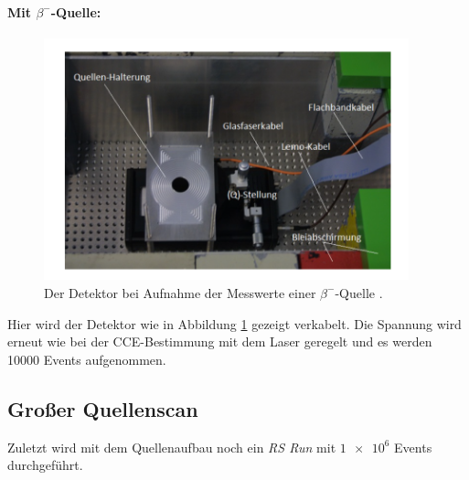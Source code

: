 \paragraph{Mit $\beta^-$-Quelle:}
\begin{figure}
  \centering
  \includegraphics[height=7cm]{TimosAufrisse/quellenmessung.png}
  \caption{Der Detektor bei Aufnahme der Messwerte einer $\beta^-$-Quelle \cite{anleitung}.}
  \label{fig:quellenmessung}
\end{figure}
Hier wird der Detektor wie in Abbildung \ref{fig:quellenmessung} gezeigt verkabelt. Die Spannung wird erneut wie bei der CCE-Bestimmung mit dem Laser geregelt und es werden \num{10000} Events aufgenommen.

\subsection{Großer Quellenscan}
Zuletzt wird mit dem Quellenaufbau noch ein \textit{RS Run} mit $\num{1e6}$ Events durchgeführt.
